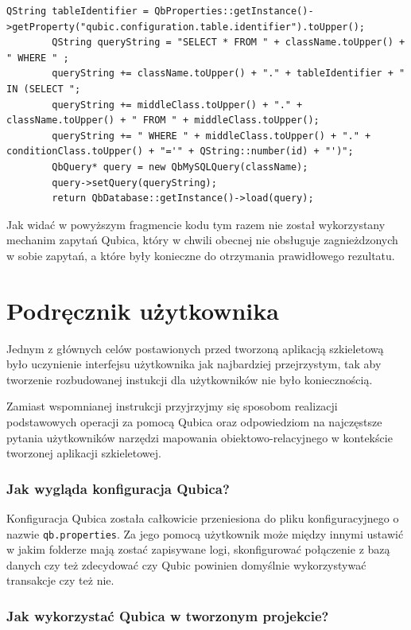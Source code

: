 \documentclass[12pt]{report}
\begin{document}
\begin{lstlisting}[style=customc,caption=Zapytanie dostępu do powiązanych danych (wiele do wielu)]
QString tableIdentifier = QbProperties::getInstance()->getProperty("qubic.configuration.table.identifier").toUpper();
        QString queryString = "SELECT * FROM " + className.toUpper() + " WHERE " ;
        queryString += className.toUpper() + "." + tableIdentifier + " IN (SELECT ";
        queryString += middleClass.toUpper() + "." + className.toUpper() + " FROM " + middleClass.toUpper();
        queryString += " WHERE " + middleClass.toUpper() + "." + conditionClass.toUpper() + "='" + QString::number(id) + "')";
        QbQuery* query = new QbMySQLQuery(className);
        query->setQuery(queryString);
        return QbDatabase::getInstance()->load(query);
\end{lstlisting}

Jak widać w powyższym fragmencie kodu tym razem nie został wykorzystany mechanim zapytań Qubica, który w chwili obecnej nie obsługuje zagnieżdzonych w sobie zapytań, a
które były konieczne do otrzymania prawidłowego rezultatu.

\section{Podręcznik użytkownika}

Jednym z głównych celów postawionych przed tworzoną aplikacją szkieletową było uczynienie interfejsu użytkownika jak najbardziej przejrzystym, tak aby tworzenie rozbudowanej
instukcji dla użytkowników nie było koniecznością. 

Zamiast wspomnianej instrukcji przyjrzyjmy się sposobom realizacji podstawowych operacji za pomocą Qubica oraz odpowiedziom na najczęstsze pytania użytkowników narzędzi
mapowania obiektowo-relacyjnego w kontekście tworzonej aplikacji szkieletowej.

\subsubsection{Jak wygląda konfiguracja Qubica?}

Konfiguracja Qubica została całkowicie przeniesiona do pliku konfiguracyjnego o nazwie {\tt qb.properties}. Za jego pomocą użytkownik może między innymi ustawić w jakim 
folderze mają zostać zapisywane logi, skonfigurować połączenie z bazą danych czy też zdecydować czy Qubic powinien domyślnie wykorzystywać transakcje czy też nie.

\subsubsection{Jak wykorzystać Qubica w tworzonym projekcie?}
\end{document}

